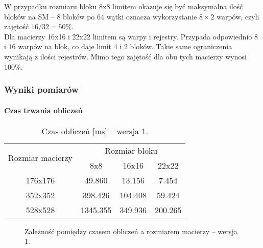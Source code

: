 W przypadku rozmiaru bloku 8x8 limitem okazuje się być maksymalna ilość bloków na SM -- $ 8 $ bloków po $ 64 $ wątki oznacza wykorzystanie $ 8 \times 2 $ warpów, czyli zajętość $ 16 / 32 = 50\% $. \\
Dla macierzy 16x16 i 22x22 limitem są warpy i rejestry. Przypada odpowiednio $ 8 $ i $ 16 $ warpów na blok, co daje limit $ 4 $ i $ 2 $ bloków. Takie same ograniczenia wynikają z ilości rejestrów. Mimo tego zajętość dla obu tych macierzy wynosi $ 100\% $.

\subsubsection{Wyniki pomiarów}

\paragraph{Czas trwania obliczeń}

\begin{table}[H]
\centering
\begin{tabular}{|c|c|c|c|}
\hline
\multirow{2}{*}{Rozmiar macierzy} & \multicolumn{3}{c|}{Rozmiar bloku} \\ \cline{2-4}
& 8x8 & 16x16 & 22x22 \\ \hline
176x176 & 49.860 & 13.156 & 7.454 \\ \hline
352x352 & 398.426 & 104.408 & 59.424 \\ \hline
528x528 & 1345.355 & 349.936 & 200.265 \\ \hline
\end{tabular}
\caption{Czas obliczeń [ms] -- wersja 1.}
\end{table}

\begin{figure}[H]
\centering
\caption{Zależność pomiędzy czasem obliczeń a rozmiarem macierzy -- wersja 1.}
\end{figure}


